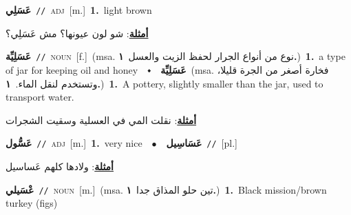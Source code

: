\documentclass[10pt,a4paper,twoside]{article} %
\begin{document}
\begin{multicols}{2}
{\setlength\topsep{0pt}\textbf{\foreignlanguage{arabic}{عَسَلِي}}\ {\color{gray}\texttt{//}\color{black}}\ \textsc{adj}\ [m.]\ \textbf{1.}~light brown\  \begin{flushright}\color{gray}\foreignlanguage{arabic}{\textbf{\underline{\foreignlanguage{arabic}{أمثلة}}}: شو لون عيونها؟ مش عَسَلِي؟}\end{flushright}\color{black}} \vspace{2mm}

{\setlength\topsep{0pt}\textbf{\foreignlanguage{arabic}{عَسَلِيِّة}}\ {\color{gray}\texttt{//}\color{black}}\ \textsc{noun}\ [f.]\ \color{gray}(msa. \foreignlanguage{arabic}{نوع من أنواع الجرار لحفظ الزيت والعسل}~\foreignlanguage{arabic}{\textbf{١.}})\color{black}\ \textbf{1.}~a type of jar for keeping oil and honey\ \ $\smblkdiamond$\ \ \setlength\topsep{0pt}\textbf{\foreignlanguage{arabic}{عَسَلِيِّة}}\ \color{gray}(msa. \foreignlanguage{arabic}{فخارة أصغر من الجرة قليلا، وتستخدم لنقل الماء.}~\foreignlanguage{arabic}{\textbf{١.}})\color{black}\ \textbf{1.}~A pottery, slightly smaller than the jar, used to transport water.\  \begin{flushright}\color{gray}\foreignlanguage{arabic}{\textbf{\underline{\foreignlanguage{arabic}{أمثلة}}}: نقلت المي في العسلية وسقيت الشجرات}\end{flushright}\color{black}} \vspace{2mm}

{\setlength\topsep{0pt}\textbf{\foreignlanguage{arabic}{عَسُّول}}\ {\color{gray}\texttt{//}\color{black}}\ \textsc{adj}\ [m.]\ \textbf{1.}~very nice\ \ $\bullet$\ \ \setlength\topsep{0pt}\textbf{\foreignlanguage{arabic}{عَسَاسِيل}}\ {\color{gray}\texttt{//}\color{black}}\ [pl.]\  \begin{flushright}\color{gray}\foreignlanguage{arabic}{\textbf{\underline{\foreignlanguage{arabic}{أمثلة}}}: ولادها كلهم عَساسيل}\end{flushright}\color{black}} \vspace{2mm}

{\setlength\topsep{0pt}\textbf{\foreignlanguage{arabic}{عْسَيلي}}\ {\color{gray}\texttt{//}\color{black}}\ \textsc{noun}\ [m.]\ \color{gray}(msa. \foreignlanguage{arabic}{تين حلو المذاق جدا}~\foreignlanguage{arabic}{\textbf{١.}})\color{black}\ \textbf{1.}~Black mission/brown turkey (figs)\ } \vspace{2mm}


\end{multicols}
\end{document}
